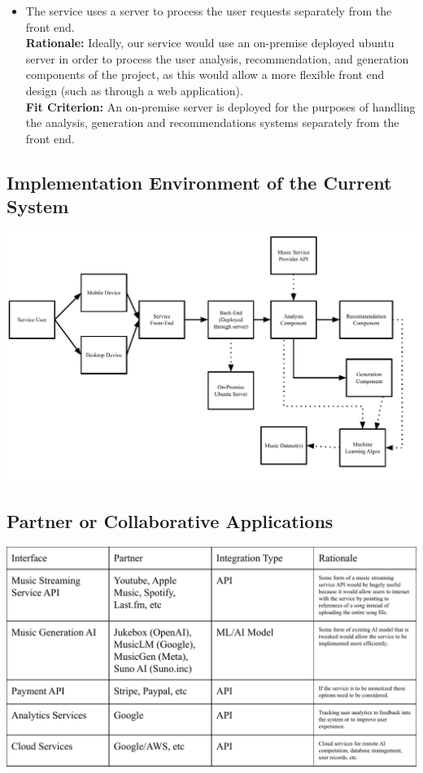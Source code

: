 \documentclass[12pt]{article}
\begin{document}
\begin{itemize}
  \item The service uses a server to process the user requests separately from the front end.
  \\ \textbf{Rationale:} Ideally, our service would use an on-premise deployed ubuntu server in order to process the user 
  analysis, recommendation, and generation components of the project, as this would allow a more flexible front end design
  (such as through a web application). 
  \\ \textbf{Fit Criterion:} An on-premise server is deployed for the purposes of handling the analysis, generation and recommendations
  systems separately from the front end. 

\end{itemize}

\subsection{Implementation Environment of the Current System}
\includegraphics[scale=0.552]{3_2_environment_diagram.pdf}

\subsection{Partner or Collaborative Applications}
\includegraphics[scale=0.72]{3_3_partner_constraints_figure}
\end{document}
